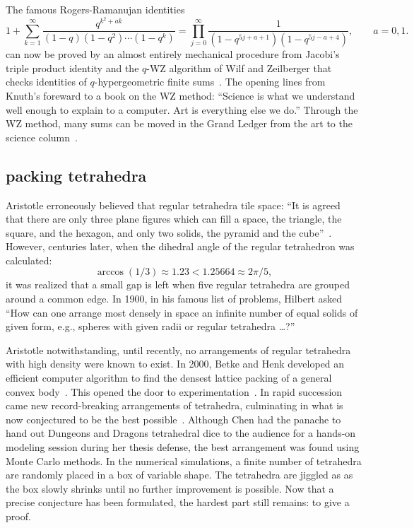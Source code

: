 \documentclass{llncs}
\begin{document}
The famous Rogers-Ramanujan identities
\[
1 + \sum_{k=1}^\infty \frac{q^{k^2+a k}}{(1-q)(1-q^2)\cdots (1-q^k)} = 
\prod_{j=0}^\infty \frac{1}{(1-q^{5j+a+1})(1- q^{5j - a +4})},
\qquad a = 0,1.
\]
can now be proved by an almost entirely mechanical procedure from
Jacobi's triple product identity and the $q$-WZ algorithm of Wilf and
Zeilberger that checks identities of $q$-hypergeometric finite
sums~\cite{PP94}.  The opening lines from Knuth's foreward to a book
on the WZ method: ``Science is what we understand well enough to
explain to a computer. Art is everything else we do.'' Through the WZ
method, many sums can be moved in the Grand Ledger from the art to the
science column~\cite{PWZ}.


\subsection{packing  tetrahedra}

Aristotle erroneously believed that regular tetrahedra tile space:
``It is agreed that there are only three plane figures which can fill
a space, the triangle, the square, and the hexagon, and only two
solids, the pyramid and the cube''~\cite{Aristotle}.  However,
centuries later, when the dihedral angle of the regular tetrahedron
was calculated:
\[
\arccos(1/3) \approx 1.23 < 1.25664 \approx 2\pi/5,
\]
it was realized that a small gap is left when five regular tetrahedra
are grouped around a common edge.  In 1900, in his famous list of
problems, Hilbert asked ``How can one arrange most densely in space an
infinite number of equal solids of given form, e.g., spheres with
given radii or regular tetrahedra \dots?''

Aristotle notwithstanding, until recently, no arrangements of regular
tetrahedra with high density were known to exist.  In 2000, Betke and
Henk developed an efficient computer algorithm to find the densest
lattice packing of a general convex body~\cite{BH2000}.  This opened
the door to experimentation~\cite{Conway-2006}.  In rapid
succession came new record-breaking arrangements of tetrahedra,
culminating in what is now conjectured to be the best
possible~\cite{Chen-2010}.  Although Chen had the panache to hand out
Dungeons and Dragons tetrahedral dice to the audience for a hands-on
modeling session during her thesis defense, the best arrangement was found
using Monte Carlo methods.  In the numerical simulations, a finite
number of tetrahedra are randomly placed in a box of variable shape.
The tetrahedra are jiggled as as the box slowly shrinks until no
further improvement is possible.  Now that a precise conjecture has
been formulated, the hardest part still remains: to give a
proof.  
\end{document}
